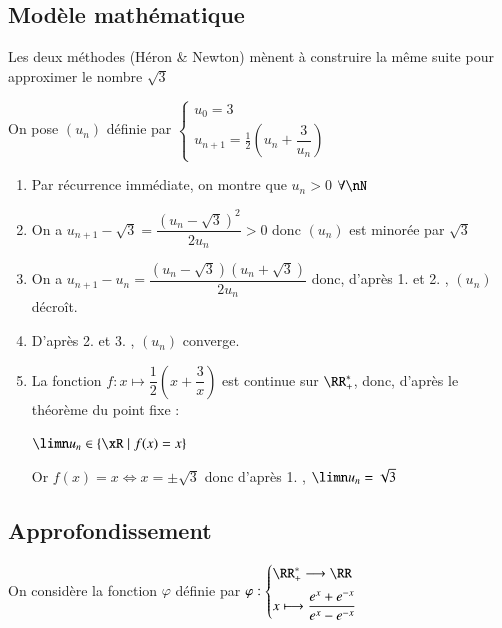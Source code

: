 \documentclass[oneside,12pt]{article}          %
\begin{document}
\subsection{Modèle mathématique}
Les deux méthodes (Héron \& Newton) mènent à construire la même suite pour approximer le nombre $\sqrt{3}$

On pose $(u_n)$ définie par $\begin{cases} u_0 = 3 \\ u_{n+1} = \frac12 \left(u_n+\dfrac{3}{u_n} \right) \end{cases}$

\begin{enumerate}

    \item Par récurrence immédiate, on montre que $u_n > 0$ \qquad $\forall\nN$

    \item On a $u_{n+1} - \sqrt3 = \dfrac{(u_n-\sqrt3)^2}{2u_n} > 0$ \quad donc $(u_n)$ est minorée par $\sqrt3$

    \item On a $u_{n+1} - u_n = \dfrac{(u_n - \sqrt3)(u_n + \sqrt3)}{2u_n}$ \quad donc, d'après 1. et 2. , $(u_n)$ décroît.

    \item D'après 2. et 3. , $(u_n)$ converge.

    \item La fonction $f:x\longmapsto \dfrac12\left(x + \dfrac3x \right)$ est continue sur $\RR_+^*$, donc, d'après le théorème du point fixe :

    $\limn u_n \in \{\xR \mid f(x)=x\}$ \qquad
    
    Or $f(x) = x \iff x = \pm\sqrt3$ \quad donc d'après 1. , $\limn u_n = \sqrt{3}$ \quad 
\end{enumerate}



\subsection{Approfondissement}
On considère la fonction $\varphi$ définie par $\varphi : \begin{cases}\RR_+^* \longrightarrow \RR \\[5pt]
x \longmapsto \dfrac{e^x+e^{-x}}{e^x-e^{-x}} \end{cases}$
\end{document}
